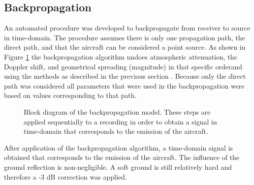\subsection{Backpropagation}
An automated procedure was developed to backpropagate from receiver to source in
time-domain. The procedure assumes there is only one propagation path,
the direct path, and that the aircraft can be considered a point source.
As shown in Figure \ref{fig:backpropagation_block_diagram} the
backpropagation algorithm undoes atmospheric attenuation, the Doppler shift, and
geometrical spreading (magnitude) in that specific orderand using the methods as
described in the previous section \cite{Rietdijk2015}.
Because only the direct path was considered all parameters that were used in the
backpropagation were based on values corresponding to that path.

\begin{figure}[H]
  \centering
{}
  \caption{Block diagram of the backpropagation model. These steps are applied sequentially to a recording in order to obtain a signal in time-domain that corresponds to the emission of the aircraft.}
  \label{fig:backpropagation_block_diagram}
\end{figure}

After application of the backpropagation algorithm, a time-domain signal is
obtained that corresponds to the emission of the aircraft. The influence of the
ground reflection is non-negligible. A soft ground is still relatively
hard and therefore a -3 dB correction was applied.

